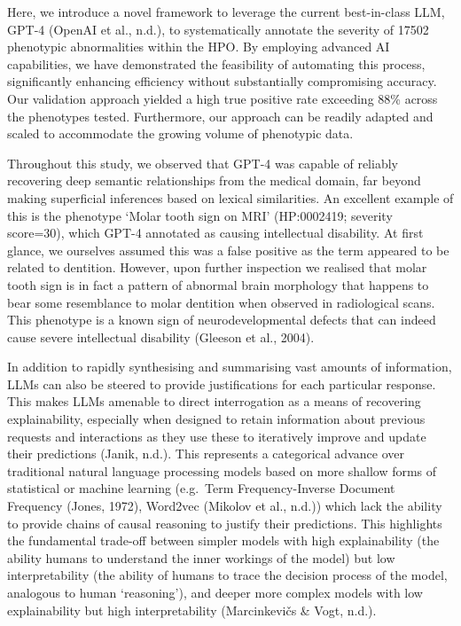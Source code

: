 \documentclass[
]{agujournal2019}
\begin{document}
Here, we introduce a novel framework to leverage the current
best-in-class LLM, GPT-4 (OpenAI et al., n.d.), to systematically
annotate the severity of 17502 phenotypic abnormalities within the HPO.
By employing advanced AI capabilities, we have demonstrated the
feasibility of automating this process, significantly enhancing
efficiency without substantially compromising accuracy. Our validation
approach yielded a high true positive rate exceeding 88\% across the
phenotypes tested. Furthermore, our approach can be readily adapted and
scaled to accommodate the growing volume of phenotypic data.

Throughout this study, we observed that GPT-4 was capable of reliably
recovering deep semantic relationships from the medical domain, far
beyond making superficial inferences based on lexical similarities. An
excellent example of this is the phenotype `Molar tooth sign on MRI'
(HP:0002419; severity score=30), which GPT-4 annotated as causing
intellectual disability. At first glance, we ourselves assumed this was
a false positive as the term appeared to be related to dentition.
However, upon further inspection we realised that molar tooth sign is in
fact a pattern of abnormal brain morphology that happens to bear some
resemblance to molar dentition when observed in radiological scans. This
phenotype is a known sign of neurodevelopmental defects that can indeed
cause severe intellectual disability (Gleeson et al., 2004).

In addition to rapidly synthesising and summarising vast amounts of
information, LLMs can also be steered to provide justifications for each
particular response. This makes LLMs amenable to direct interrogation as
a means of recovering explainability, especially when designed to retain
information about previous requests and interactions as they use these
to iteratively improve and update their predictions (Janik, n.d.). This
represents a categorical advance over traditional natural language
processing models based on more shallow forms of statistical or machine
learning (e.g.~Term Frequency-Inverse Document Frequency (Jones, 1972),
Word2vec (Mikolov et al., n.d.)) which lack the ability to provide
chains of causal reasoning to justify their predictions. This highlights
the fundamental trade-off between simpler models with high
explainability (the ability humans to understand the inner workings of
the model) but low interpretability (the ability of humans to trace the
decision process of the model, analogous to human `reasoning'), and
deeper more complex models with low explainability but high
interpretability (Marcinkevičs \& Vogt, n.d.).
\end{document}
